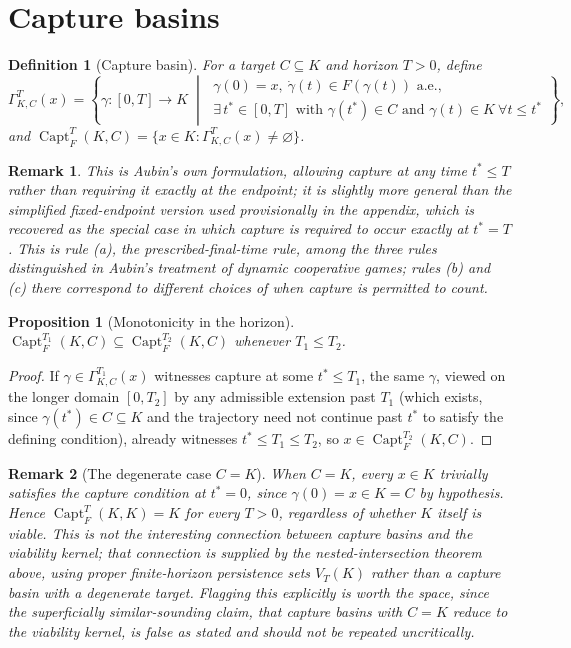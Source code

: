 \documentclass[11pt]{report}
\newtheorem{proposition}{Proposition}[chapter]
\newtheorem{definition}{Definition}[chapter]
\newtheorem{remark}{Remark}[chapter]
\begin{document}
\section*{Capture basins}

\begin{definition}[Capture basin]
For a target $C \subseteq K$ and horizon $T > 0$, define
\[
\Gamma^T_{K,C}(x) = \left\{ \gamma : [0,T] \to K \;\middle|\;
\begin{array}{l}
\gamma(0) = x,\ \dot\gamma(t) \in F(\gamma(t)) \text{ a.e.}, \\
\exists\, t^\ast \in [0,T] \text{ with } \gamma(t^\ast) \in C \text{ and } \gamma(t) \in K\ \forall t \leq t^\ast
\end{array}
\right\},
\]
and $\operatorname{Capt}_F^T(K,C) = \{x \in K : \Gamma^T_{K,C}(x) \neq \varnothing\}$.
\end{definition}

\begin{remark}
This is Aubin's own formulation, allowing capture at any time
$t^\ast \leq T$ rather than requiring it exactly at the endpoint; it is
slightly more general than the simplified fixed-endpoint version used
provisionally in the appendix, which is recovered as the special case
in which capture is required to occur exactly at $t^\ast = T$. This
is rule (a), the prescribed-final-time rule, among the three
rules distinguished in Aubin's treatment of dynamic cooperative games;
rules (b) and (c) there correspond to different choices of when capture
is permitted to count.
\end{remark}

\begin{proposition}[Monotonicity in the horizon]
$\operatorname{Capt}_F^{T_1}(K,C) \subseteq \operatorname{Capt}_F^{T_2}(K,C)$
whenever $T_1 \leq T_2$.
\end{proposition}
\begin{proof}
If $\gamma \in \Gamma^{T_1}_{K,C}(x)$ witnesses capture at some
$t^\ast \leq T_1$, the same $\gamma$, viewed on the longer domain
$[0,T_2]$ by any admissible extension past $T_1$ (which exists, since
$\gamma(t^\ast) \in C \subseteq K$ and the trajectory need not continue
past $t^\ast$ to satisfy the defining condition), already witnesses
$t^\ast \leq T_1 \leq T_2$, so $x \in \operatorname{Capt}_F^{T_2}(K,C)$.
\end{proof}

\begin{remark}[The degenerate case $C = K$]
When $C = K$, every $x \in K$ trivially satisfies the capture condition
at $t^\ast = 0$, since $\gamma(0) = x \in K = C$ by hypothesis. Hence
$\operatorname{Capt}_F^T(K,K) = K$ for every $T > 0$, regardless of
whether $K$ itself is viable. This is not the interesting connection
between capture basins and the viability kernel; that connection is
supplied by the nested-intersection theorem above, using proper
finite-horizon persistence sets $V_T(K)$ rather than a capture basin
with a degenerate target. Flagging this explicitly is worth the space,
since the superficially similar-sounding claim, that capture basins
with $C = K$ reduce to the viability kernel, is false as stated and
should not be repeated uncritically.
\end{remark}
\end{document}
